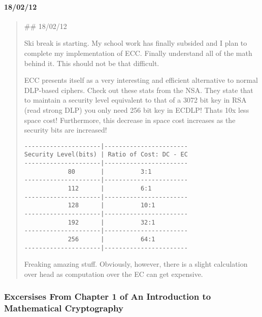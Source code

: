 \documentclass[12pt, a4paper, final]{report}
\begin{document}
\paragraph*{18/02/12}
\begin{quote}
\#\# 18/02/12

Ski break is starting. My school work has finally subsided and I plan to
complete my implementation of ECC. Finally understand all of the math behind it.
This should not be that difficult.

ECC presents itself as a very interesting and efficient alternative to normal
DLP-based ciphers. Check out these stats from the NSA. They state that to maintain
a security level equivalent to that of a 3072 bit key in RSA (read strong DLP) you
only need 256 bit key in ECDLP! Thats 10x less space cost! Furthermore, this
decrease in space cost increases as the security bits are increased!

\begin{verbatim}
---------------------|-----------------------
Security Level(bits) | Ratio of Cost: DC - EC
---------------------|-----------------------
            80       |          3:1
---------------------|-----------------------
            112      |          6:1
---------------------|-----------------------
            128      |          10:1
---------------------|-----------------------
            192      |          32:1
---------------------|-----------------------
            256      |          64:1
---------------------|-----------------------
\end{verbatim}

Freaking amazing stuff. Obviously, however, there is a slight calculation over
head as computation over the EC can get expensive.
\end{quote}

\subsubsection*{Excersises From Chapter 1 of An
Introduction to Mathematical Cryptography}
\end{document}
